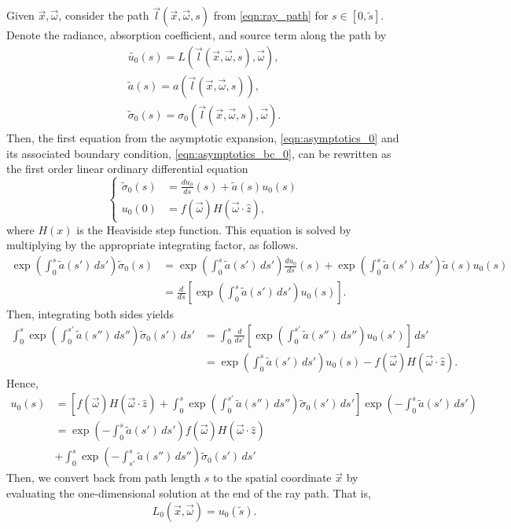 Given $\vec{x}, \vec{\omega}$, consider the path $\vec{l}(\vec{x}, \vec{\omega}, s)$ from \eqref{eqn:ray_path} for $s \in [0, \tilde{s}]$.
Denote the radiance, absorption coefficient, and source term along the path by
\begin{align*}
  \tilde{u_0}(s) = L(\vec{l}(\vec{x}, \vec{\omega}, s), \vec{\omega}), \\
  \tilde{a}(s) = a(\vec{l}(\vec{x}, \vec{\omega}, s)), \\
  \tilde\sigma_0(s) = \sigma_0(\vec{l}(\vec{x}, \vec{\omega}, s), \vec{\omega}).
\end{align*}
Then, the first equation from the asymptotic expansion, \eqref{eqn:asymptotics_0} and its associated boundary condition, \eqref{eqn:asymptotics_bc_0}, can be rewritten as the first order linear ordinary differential equation
\begin{equation}
  \left\{
  \begin{aligned}
  \tilde\sigma_0(s) &= \frac{du_0}{ds}(s) + \tilde{a}(s) u_0(s) \\
  u_0(0) &= f(\vec{\omega})H(\vec{\omega}\cdot\hat{z}),
  \end{aligned}
  \right.
  \label{eqn:asymptotics_ode_0}
\end{equation}
where $H(x)$ is the Heaviside step function.
This equation is solved by multiplying by the appropriate integrating factor, as follows.
\begin{align*}
  \exp\left(\int_0^s \tilde{a}(s')\, ds'\right)\tilde\sigma_0(s) &= \exp\left(\int_0^s \tilde{a}(s')\, ds'\right) \frac{du_0}{ds}(s) + \exp\left(\int_0^s \tilde{a}(s')\, ds'\right) \tilde{a}(s) u_0(s) \\
  &= \frac{d}{ds}\left[\exp\left(\int_0^s \tilde{a}(s')\, ds'\right) u_0(s)\right].
\end{align*}
Then, integrating both sides yields
\begin{align*}
  \int_0^s \exp\left(\int_0^{s'} \tilde{a}(s'')\, ds''\right)\tilde\sigma_0(s')\, ds' &= \int_0^s \frac{d}{ds'}\left[\exp\left(\int_0^{s'} \tilde{a}(s'')\, ds''\right) u_0(s')\right]\, ds' \\
  &= \exp\left(\int_0^s \tilde{a}(s')\, ds'\right) u_0(s) - f(\vec{\omega})H(\vec{\omega}\cdot\hat{z}).
\end{align*}
Hence,
\begin{align}
  u_0(s) &= \left[f(\vec{\omega})H(\vec{\omega}\cdot\hat{z}) + \int_0^s \exp\left(\int_0^{s'} \tilde{a}(s'')\, ds''\right) \tilde\sigma_0(s')\, ds'\right] \exp\left(-\int_0^s \tilde{a}(s')\, ds'\right) \nonumber\\
  &= \exp\left(-\int_0^s \tilde{a}(s')\, ds'\right) f(\vec{\omega})H(\vec{\omega}\cdot\hat{z}) \nonumber\\
    &+ \int_0^s \exp\left(-\int_{s'}^s \tilde{a}(s'')\, ds''\right) \tilde\sigma_0(s')\, ds'
  \label{eqn:asymptotics_soln_0}
\end{align}
Then, we convert back from path length $s$ to the spatial coordinate $\vec{x}$ by evaluating the one-dimensional solution at the end of the ray path.
That is,
\begin{equation*}
  L_0(\vec{x}, \vec{\omega}) = u_0(\tilde{s}).
\end{equation*}

